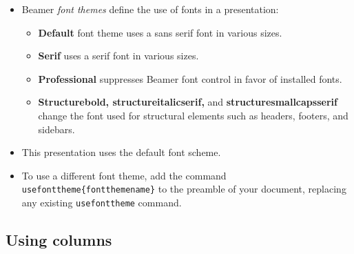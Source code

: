 \documentclass[notes=show,beamer]{beamer}
\begin{document}
\begin{frame}%


\begin{itemize}
\item Beamer \textit{font themes }define the use of fonts in a presentation:

\begin{itemize}
\item \textbf{Default }font theme uses a sans serif font in various sizes.

\item \textbf{Serif }uses a serif font in various sizes.

\item \textbf{Professional }suppresses Beamer font control in favor of
installed fonts.

\item \textbf{Structurebold, structureitalicserif, }and \textbf{%
structuresmallcapsserif }change the font used for structural elements such
as headers, footers, and sidebars.
\end{itemize}

\item This presentation uses the default font scheme.

\item To use a different font theme, add the command \texttt{\TEXTsymbol{%
\backslash}usefonttheme\{fontthemename\}} to the preamble of your document,
replacing any existing \texttt{\TEXTsymbol{\backslash}usefonttheme} command.
\end{itemize}

\transboxout%
\end{frame}%

\subsection{Using columns}
\end{document}
